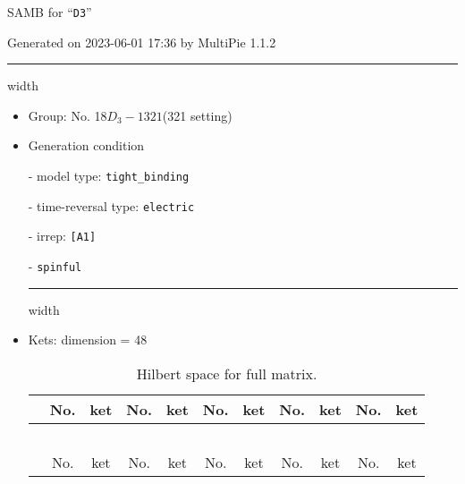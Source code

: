 \documentclass[fleqn,10pt,landscape]{article}
\begin{document}
\setcounter{MaxMatrixCols}{16}

\setlength{\baselineskip}{16pt}
\footnotesize
\begin{center}
\LARGE
SAMB for ``\texttt{D3}''
\end{center}
\begin{flushright}
Generated on 2023-06-01 17:36 by MultiPie 1.1.2
\end{flushright}
\vspace{1cm}


 \hfil \hrule height 1mm width \textwidth \hfil

\begin{itemize}
\item Group: No. 18\quad$D_{3}-1$\quad$321$\quad(321 setting)\quad[ trigonal ]

\vspace{5mm}

\item Generation condition

\quad - model type: \texttt{tight_binding}

\quad - time-reversal type: \texttt{electric}

\quad - irrep: \texttt{[A1]}

\quad - \texttt{spinful}


 \hfil \hrule height 1mm width \textwidth \hfil

\item Kets: dimension = 48
\begin{center}
\renewcommand{\arraystretch}{1.3}
\begin{longtable}{c|cc|cc|cc|cc|cc}
\caption{Hilbert space for full matrix.}
 \\
 \hline \hline
 & No. & ket & No. & ket & No. & ket & No. & ket & No. & ket \\ \hline \endfirsthead

\multicolumn{10}{l}{\tablename\ \thetable{}} \\
 \hline \hline
 & No. & ket & No. & ket & No. & ket & No. & ket & No. & ket \\ \hline \endhead


\end{longtable}
\end{center}
\end{itemize}
\end{document}
